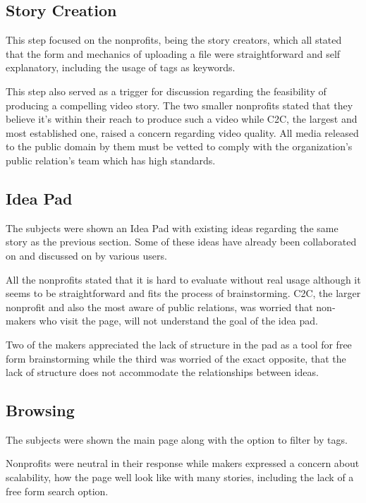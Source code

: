 \subsection{Story Creation}

This step focused on the nonprofits, being the story creators, which all stated that the form and mechanics of uploading a file were straightforward and self explanatory, including the usage of tags as keywords. 

This step also served as a trigger for discussion regarding the feasibility of producing a compelling video story. The two smaller nonprofits stated that they believe it's within their reach to produce such a video while C2C, the largest and most established one, raised a concern regarding video quality. All media released to the public domain by them must be vetted to comply with the organization's public relation's team which has high standards.   

\subsection{Idea Pad}

The subjects were shown an Idea Pad with existing ideas regarding the same story as the previous section. Some of these ideas have already been collaborated on and discussed on by various users.

All the nonprofits stated that it is hard to evaluate without real usage although it seems to be straightforward and fits the process of brainstorming. C2C, the larger nonprofit and also the most aware of public relations, was worried that non-makers who visit the page, will not understand the goal of the idea pad.   

Two of the makers appreciated the lack of structure in the pad as a tool for free form brainstorming while the third was worried of the exact opposite, that the lack of structure does not accommodate the relationships between ideas.

\subsection{Browsing}

The subjects were shown the main page along with the option to filter by tags.

Nonprofits were neutral in their response while makers expressed a concern about scalability, how the page well look like with many stories, including the lack of a free form search option.

